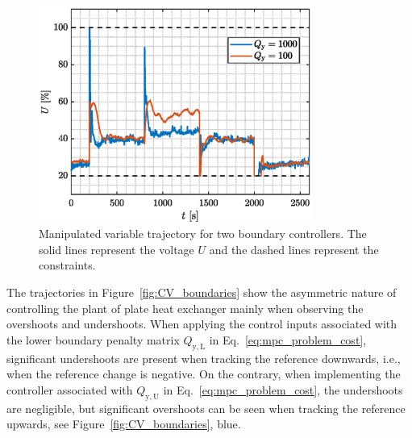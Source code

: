 \documentclass[preprint,12pt]{elsarticle}
\begin{document}
\begin{figure}
	\begin{center}
		\includegraphics[width=0.8\textwidth]{images/MV_boundaries}
		\caption{Manipulated variable trajectory for two boundary controllers. The solid lines represent the voltage $U$ and the dashed lines represent the constraints.}
		\label{fig:MV_boundaries}
	\end{center}
\end{figure}

The trajectories in Figure~\ref{fig:CV_boundaries} show the asymmetric nature of controlling the plant of plate heat exchanger mainly when observing the overshoots and undershoots. When applying the control inputs associated with the lower boundary penalty matrix $Q_\mathrm{y, L}$ in Eq.~\eqref{eq:mpc_problem_cost}, significant undershoots are present when tracking the reference downwards, i.e., when the reference change is negative. On the contrary, when implementing the controller associated with $Q_\mathrm{y, U}$ in Eq.~\eqref{eq:mpc_problem_cost}, the undershoots are negligible, but significant overshoots can be seen when tracking the reference upwards, see Figure~\ref{fig:CV_boundaries}, blue.
\end{document}
